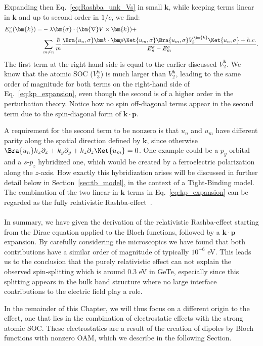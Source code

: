 Expanding then Eq.~\eqref{eq:Rashba_unk_Vs} in small $\bm{k}$, while keeping terms linear in $\bm{k}$ and up to second order in $1/c$, we find:
\begin{align}
	\label{eq:kp_expansion}
	E_n^{\sigma}(\bm{k}) =& -\lambda \bm{\sigma} \cdot ( \bm{\nabla}V \times \bm{k}) + \\
		& \sum_{m \neq n}\frac{\hbar}{m}\frac{\Bra{u_n,\sigma} \bm k \cdot \bm p \Ket{u_m, \sigma}\Bra{u_m, \sigma} V_3^{\bm{k}} \Ket{u_n, \sigma} + h.c.}{E_n^{\sigma} - E_m^{\sigma}}.\nonumber
\end{align}
The first term at the right-hand side is equal to the earlier discussed $V^{\bm k}_2$.
We know that the atomic SOC ($V^{\bm k}_3$) is much larger than $V^{\bm{k}}_2$, leading to the same order of magnitude for both terms on the right-hand side of Eq.~\eqref{eq:kp_expansion}, even though the second is of a higher order in the perturbation theory. Notice how no spin off-diagonal terms appear in the second term due to the spin-diagonal form of $\bm k \cdot \bm p$.

A requirement for the second term to be nonzero is that $u_n$ and $u_m$ have different parity along the spatial direction defined by $\bm{k}$, since otherwise $\Bra{u_n} k_x \partial_x + k_y \partial_y + k_z \partial_z \Ket{u_m} = 0$.
One example could be a $p_y$ orbital and a $s$-$p_z$ hybridized one, which would be created by a ferroelectric polarization along the $z$-axis.
How exactly this hybridization arises will be discussed in further detail below in Section~\ref{sec:tb_model}, in the context of a Tight-Binding model.
The combination of the two linear-in-$\bm{k}$ terms in Eq.~\eqref{eq:kp_expansion} can be regarded as the fully relativistic Rashba-effect~\cite{Bahramy2011}.
\\\\
In summary, we have given the derivation of the relativistic Rashba-effect starting from the Dirac equation applied to the Bloch functions, followed by a $\bm k \cdot \bm p$ expansion.
By carefully considering the microscopics we have found that both contributions have a similar order of magnitude of typically $10^{-6}$ eV.
This leads us to the conclusion that the purely relativistic effect can not explain the observed spin-splitting which is around 0.3 eV in GeTe, especially since this splitting appears in the bulk band structure where no large interface contributions to the electric field play a role.

In the remainder of this Chapter, we will thus focus on a different origin to the effect, one that lies in the combination of electrostatic effects with the strong atomic SOC.
These electrostatics are a result of the creation of dipoles by Bloch functions with nonzero OAM, which we describe in the following Section. 
